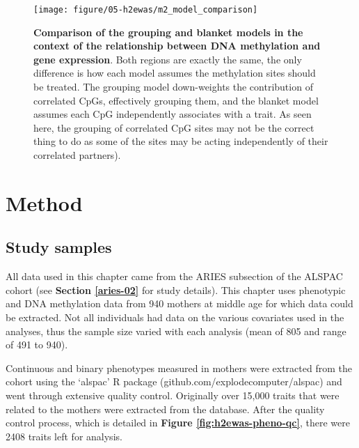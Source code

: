 \documentclass[11pt,twoside]{bristolthesis}
\begin{document}
\begin{figure}

{\centering \texttt{[image: figure/05-h2ewas/m2\_model\_comparison]} 

}

\caption[Comparison of the grouping and blanket models in the context of the relationship between DNA methylation and gene expression]{\textbf{Comparison of the grouping and blanket models in the context of the relationship between DNA methylation and gene expression}. Both regions are exactly the same, the only difference is how each model assumes the methylation sites should be treated. The grouping model down-weights the contribution of correlated CpGs, effectively grouping them, and the blanket model assumes each CpG independently associates with a trait. As seen here, the grouping of correlated CpG sites may not be the correct thing to do as some of the sites may be acting independently of their correlated partners).}\label{fig:h2ewas-model-comp}
\end{figure}
\hypertarget{method-05}{%
\section{Method}\label{method-05}}

\hypertarget{study-samples-05}{%
\subsection{Study samples}\label{study-samples-05}}

All data used in this chapter came from the ARIES subsection of the ALSPAC cohort (see \textbf{Section \ref{aries-02}} for study details). This chapter uses phenotypic and DNA methylation data from 940 mothers at middle age for which data could be extracted. Not all individuals had data on the various covariates used in the analyses, thus the sample size varied with each analysis (mean of 805 and range of 491 to 940).

Continuous and binary phenotypes measured in mothers were extracted from the cohort using the `alspac' R package (github.com/explodecomputer/alspac) and went through extensive quality control. Originally over 15,000 traits that were related to the mothers were extracted from the database. After the quality control process, which is detailed in \textbf{Figure \ref{fig:h2ewas-pheno-qc}}, there were 2408 traits left for analysis.
\end{document}
